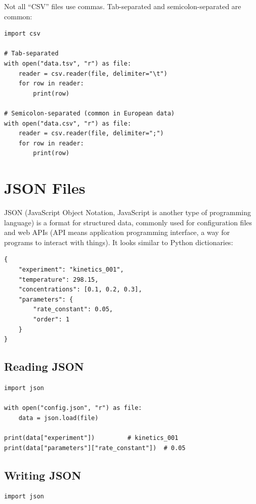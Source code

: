 \begin{labexample}
Not all ``CSV'' files use commas. Tab-separated and semicolon-separated are common:

\begin{lstlisting}
import csv

# Tab-separated
with open("data.tsv", "r") as file:
    reader = csv.reader(file, delimiter="\t")
    for row in reader:
        print(row)

# Semicolon-separated (common in European data)
with open("data.csv", "r") as file:
    reader = csv.reader(file, delimiter=";")
    for row in reader:
        print(row)
\end{lstlisting}

\section{JSON Files}
\label{sec:json}

JSON (JavaScript Object Notation, JavaScript is another type of programming language) is a format for structured data, commonly used for configuration files and web APIs (API means application programming interface, a way for programs to interact with things). It looks similar to Python dictionaries:

\begin{lstlisting}[style=outputstyle]
{
    "experiment": "kinetics_001",
    "temperature": 298.15,
    "concentrations": [0.1, 0.2, 0.3],
    "parameters": {
        "rate_constant": 0.05,
        "order": 1
    }
}
\end{lstlisting}

\subsection{Reading JSON}

\begin{lstlisting}
import json

with open("config.json", "r") as file:
    data = json.load(file)

print(data["experiment"])         # kinetics_001
print(data["parameters"]["rate_constant"])  # 0.05
\end{lstlisting}

\subsection{Writing JSON}

\begin{lstlisting}
import json


\end{lstlisting}
\end{labexample}
